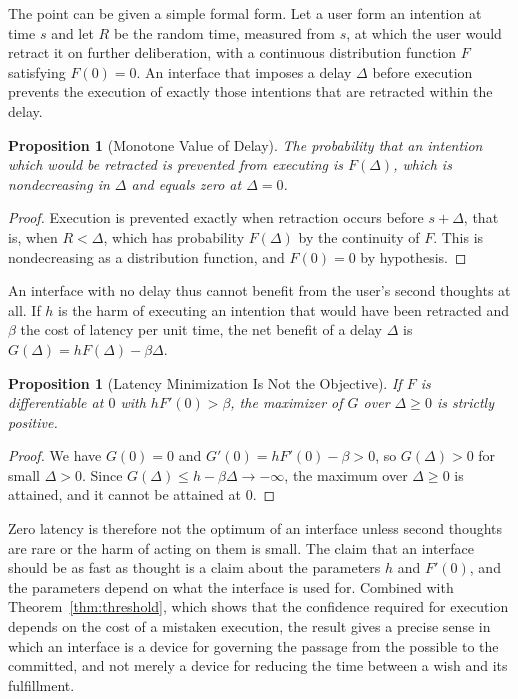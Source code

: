\documentclass[11pt,twoside,openany]{book}
\newtheorem{proposition}[theorem]{Proposition}
\theoremstyle{definition}
\theoremstyle{remark}
\begin{document}
The point can be given a simple formal form. Let a user form an intention at time $s$ and let $R$ be the random time, measured from $s$, at which the user would retract it on further deliberation, with a continuous distribution function $F$ satisfying $F(0)=0$. An interface that imposes a delay $\Delta$ before execution prevents the execution of exactly those intentions that are retracted within the delay.

\begin{proposition}[Monotone Value of Delay]\label{prop:delay}
The probability that an intention which would be retracted is prevented from executing is $F(\Delta)$, which is nondecreasing in $\Delta$ and equals zero at $\Delta=0$.
\end{proposition}
\begin{proof}
Execution is prevented exactly when retraction occurs before $s+\Delta$, that is, when $R<\Delta$, which has probability $F(\Delta)$ by the continuity of $F$. This is nondecreasing as a distribution function, and $F(0)=0$ by hypothesis.
\end{proof}

An interface with no delay thus cannot benefit from the user's second thoughts at all. If $h$ is the harm of executing an intention that would have been retracted and $\beta$ the cost of latency per unit time, the net benefit of a delay $\Delta$ is $G(\Delta)=hF(\Delta)-\beta\Delta$.

\begin{proposition}[Latency Minimization Is Not the Objective]\label{prop:interior}
If $F$ is differentiable at $0$ with $hF'(0)>\beta$, the maximizer of $G$ over $\Delta\ge0$ is strictly positive.
\end{proposition}
\begin{proof}
We have $G(0)=0$ and $G'(0)=hF'(0)-\beta>0$, so $G(\Delta)>0$ for small $\Delta>0$. Since $G(\Delta)\le h-\beta\Delta\to-\infty$, the maximum over $\Delta\ge0$ is attained, and it cannot be attained at $0$.
\end{proof}

Zero latency is therefore not the optimum of an interface unless second thoughts are rare or the harm of acting on them is small. The claim that an interface should be as fast as thought is a claim about the parameters $h$ and $F'(0)$, and the parameters depend on what the interface is used for. Combined with Theorem~\ref{thm:threshold}, which shows that the confidence required for execution depends on the cost of a mistaken execution, the result gives a precise sense in which an interface is a device for governing the passage from the possible to the committed, and not merely a device for reducing the time between a wish and its fulfillment.
\end{document}
